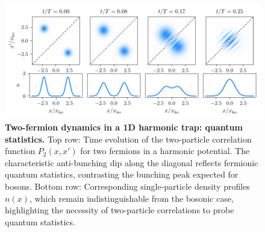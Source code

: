 \begin{figure}
    \centering
    \includegraphics{fig-py/interference.pdf}
    \caption{
        \textbf{Two-fermion dynamics in a 1D harmonic trap: quantum statistics.}
        Top row: Time evolution of the two-particle correlation function $P_2(x,x')$ for two fermions in a harmonic potential. The characteristic anti-bunching dip along the diagonal reflects fermionic quantum statistics, contrasting the bunching peak expected for bosons. Bottom row: Corresponding single-particle density profiles $n(x)$, which remain indistinguishable from the bosonic case, highlighting the necessity of two-particle correlations to probe quantum statistics.
        }
    \label{fig:interference}
\end{figure}

